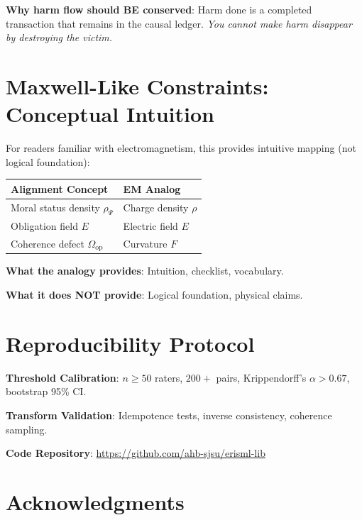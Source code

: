 \documentclass[12pt]{article}
\begin{document}
\textbf{Why harm flow should BE conserved}: Harm done is a completed transaction that remains in the causal ledger. \emph{You cannot make harm disappear by destroying the victim.}

\section{Maxwell-Like Constraints: Conceptual Intuition}

For readers familiar with electromagnetism, this provides intuitive mapping (not logical foundation):

\begin{table}[ht]
\centering
\begin{tabular}{@{}ll@{}}
\toprule
\textbf{Alignment Concept} & \textbf{EM Analog} \\
\midrule
Moral status density $\rho_\Psi$ & Charge density $\rho$ \\
Obligation field $E$ & Electric field $E$ \\
Coherence defect $\Omega_{\mathrm{op}}$ & Curvature $F$ \\
\bottomrule
\end{tabular}
\end{table}

\textbf{What the analogy provides}: Intuition, checklist, vocabulary.

\textbf{What it does NOT provide}: Logical foundation, physical claims.

\section{Reproducibility Protocol}

\textbf{Threshold Calibration}: $n \geq 50$ raters, $200+$ pairs, Krippendorff's $\alpha > 0.67$, bootstrap 95\% CI.

\textbf{Transform Validation}: Idempotence tests, inverse consistency, coherence sampling.

\textbf{Code Repository}: \url{https://github.com/ahb-sjsu/erisml-lib}

\section*{Acknowledgments}
\end{document}
